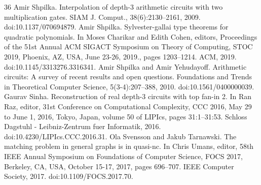 \begin{thebibliography}{36}
Amir Shpilka. Interpolation of depth-3 arithmetic circuits with two multiplication gates. SIAM J. Comput., 38(6):2130–2161, 2009. doi:10.1137/070694879.
Amir Shpilka. Sylvester-gallai type theorems for quadratic polynomials. In Moses Charikar and Edith Cohen, editors, Proceedings of the 51st Annual ACM SIGACT Symposium on Theory of Computing, STOC 2019, Phoenix, AZ, USA, June 23-26, 2019., pages 1203–1214. ACM, 2019. doi:10.1145/3313276.3316341.
Amir Shpilka and Amir Yehudayoff. Arithmetic circuits: A survey of recent results and open questions. Foundations and Trends in Theoretical Computer Science, 5(3-4):207–388, 2010. doi:10.1561/0400000039.
Gaurav Sinha. Reconstruction of real depth-3 circuits with top fan-in 2. In Ran Raz, editor, 31st Conference on Computational Complexity, CCC 2016, May 29 to June 1, 2016, Tokyo, Japan, volume 50 of LIPIcs, pages 31:1–31:53. Schloss Dagstuhl - Leibniz-Zentrum fuer Informatik, 2016. doi:10.4230/LIPIcs.CCC.2016.31.
Ola Svensson and Jakub Tarnawski. The matching problem in general graphs is in quasi-nc. In Chris Umans, editor, 58th IEEE Annual Symposium on Foundations of Computer Science, FOCS 2017, Berkeley, CA, USA, October 15-17, 2017, pages 696–707. IEEE Computer Society, 2017. doi:10.1109/FOCS.2017.70.
\end{thebibliography}
